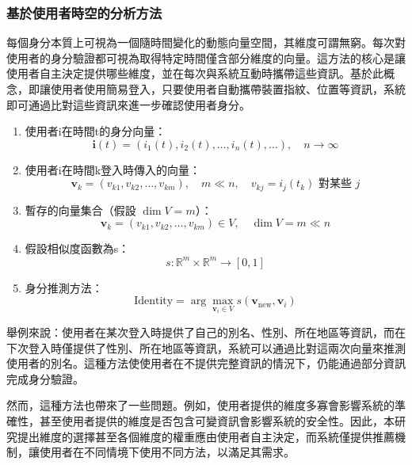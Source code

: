 \subsubsection{基於使用者時空的分析方法}
每個身分本質上可視為一個隨時間變化的動態向量空間，其維度可謂無窮。每次對使用者的身分驗證都可視為取得特定時間僅含部分維度的向量。這方法的核心是讓使用者自主決定提供哪些維度，並在每次與系統互動時攜帶這些資訊。基於此概念，即讓使用者使用簡易登入，只要使用者自動攜帶裝置指紋、位置等資訊，系統即可通過比對這些資訊來進一步確認使用者身分。
\begin{enumerate}
  \item 使用者i在時間t的身分向量：
        \begin{equation}
          \mathbf{i}(t) = (i_1(t), i_2(t), \ldots, i_n(t), \ldots), \quad n \to \infty
        \end{equation}
  \item 使用者i在時間k登入時傳入的向量：
        \begin{equation}
          \mathbf{v}_k = (v_{k1}, v_{k2}, \ldots, v_{km}), \quad m \ll n, \quad v_{kj} = i_j(t_k) \text{ 對某些 } j
        \end{equation}
  \item 暫存的向量集合（假設 $\dim V = m$）：
        \begin{equation}
          \mathbf{v}_k = (v_{k1}, v_{k2}, \ldots, v_{km}) \in V, \quad \dim V = m \ll n
        \end{equation}
  \item 假設相似度函數為s：
        \begin{equation}
          s: \mathbb{R}^m \times \mathbb{R}^m \to [0, 1]
        \end{equation}
  \item 身分推測方法：
        \begin{equation}
          \text{Identity} = \arg\max_{\mathbf{v}_i \in V} s(\mathbf{v}_{\text{new}}, \mathbf{v}_i)
        \end{equation}
\end{enumerate}
舉例來說：使用者在某次登入時提供了自己的別名、性別、所在地區等資訊，而在下次登入時僅提供了性別、所在地區等資訊，系統可以通過比對這兩次向量來推測使用者的別名。這種方法使使用者在不提供完整資訊的情況下，仍能通過部分資訊完成身分驗證。

然而，這種方法也帶來了一些問題。例如，使用者提供的維度多寡會影響系統的準確性，甚至使用者提供的維度是否包含可變資訊會影響系統的安全性。因此，本研究提出維度的選擇甚至各個維度的權重應由使用者自主決定，而系統僅提供推薦機制，讓使用者在不同情境下使用不同方法，以滿足其需求。
